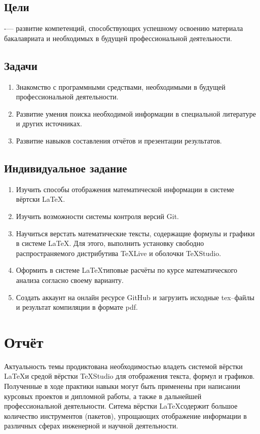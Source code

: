 \documentclass[12pt]{article}
\begin{document}
\subsection{Цели}
-— развитие компетенций, способствующих успешному освоению материала бакалавриата и необходимых в будущей профессиональной деятельности.
\subsection{Задачи}
\begin{enumerate}
\item Знакомство с программными средствами, необходимыми в будущей профессиональной деятельности.
\item Развитие умения поиска необходимой информации в специальной литературе и других источниках.
\item Развитие навыков составления отчётов и презентации результатов.
\end{enumerate}
\subsection{Индивидуальное задание}
\begin{enumerate}
\item Изучить способы отображения математической информации в системе вёртски \LaTeX.
\item Изучить возможности системы контроля версий \textsf{Git}.
\item Научиться верстать математические тексты, содержащие формулы и графики в системе \LaTeX.
Для этого, выполнить установку свободно распространяемого дистрибутива \textsf{TeXLive} и оболочки \textsf{TeXStudio}.
\item Оформить в системе \LaTeX типовые расчёты по курсе математического анализа согласно своему варианту.
\item Создать аккаунт на онлайн ресурсе \textsf{GitHub} и загрузить исходные \textsf{tex}--файлы
и результат компиляции в формате \textsf{pdf}.
\end{enumerate}
\newpage
\section{Отчёт}
Актуальность темы продиктована необходимостью владеть системой вёрстки \LaTeX и средой вёрстки \textsf{TeXStudio} для
отображения текста, формул и графиков. Полученные в ходе практики навыки могут быть применены при написании
курсовых проектов и дипломной работы, а также в дальнейшей профессиональной деятельности.
Ситема вёрстки \LaTeX содержит большое количество инструментов (пакетов), упрощающих отображение информации в различных
сферах инженерной и научной деятельности.
 
\end{document}
